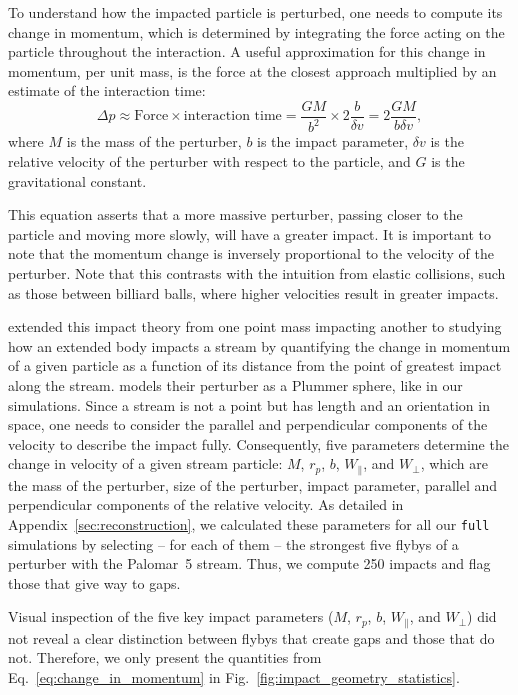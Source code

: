         To understand how the impacted particle is perturbed, one needs to compute its change in momentum, which is determined by integrating the force acting on the particle throughout the interaction. A useful approximation for this change in momentum, per unit mass, is the force at the closest approach multiplied by an estimate of the interaction time:
        \begin{equation} \label{eq:change_in_momentum} \Delta p \approx \text{Force} \times \text{interaction time} = \frac{GM}{b^2} \times 2\frac{b}{\delta v} = 2\frac{GM}{b \delta v}, \end{equation}where $M$ is the mass of the perturber, $b$ is the impact parameter, $\delta v$ is the relative velocity of the perturber with respect to the particle, and $G$ is the gravitational constant. 

        This equation asserts that a more massive perturber, passing closer to the particle and moving more slowly, will have a greater impact. It is important to note that the momentum change is inversely proportional to the velocity of the perturber. Note that this contrasts with the intuition from elastic collisions, such as those between billiard balls, where higher velocities result in greater impacts.

        \citet{2015MNRAS.450.1136E} extended this impact theory from one point mass impacting another to studying how an extended body impacts a stream by quantifying the change in momentum of a given particle as a function of its distance from the point of greatest impact along the stream. \citet{2015MNRAS.450.1136E} models their perturber as a Plummer sphere, like in our simulations. Since a stream is not a point but has length and an orientation in space, one needs to consider the parallel and perpendicular components of the velocity to describe the impact fully. Consequently, five parameters determine the change in velocity of a given stream particle: $M$, $r_p$, $b$, $W_\parallel$, and $W_\perp$, which are the mass of the perturber, size of the perturber, impact parameter, parallel and perpendicular components of the relative velocity. As detailed in Appendix~\ref{sec:reconstruction}, we calculated these parameters for all our \texttt{full} simulations by selecting -- for each of them --  the strongest five flybys of a perturber with the Palomar~5 stream. Thus, we compute 250 impacts and flag those that give way to gaps. 

        Visual inspection of the five key impact parameters ($M$, $r_p$, $b$, $W_\parallel$, and $W_\perp$) did not reveal a clear distinction between flybys that create gaps and those that do not. Therefore, we only present the quantities from Eq.~\ref{eq:change_in_momentum} in Fig.~\ref{fig:impact_geometry_statistics}. 
    
